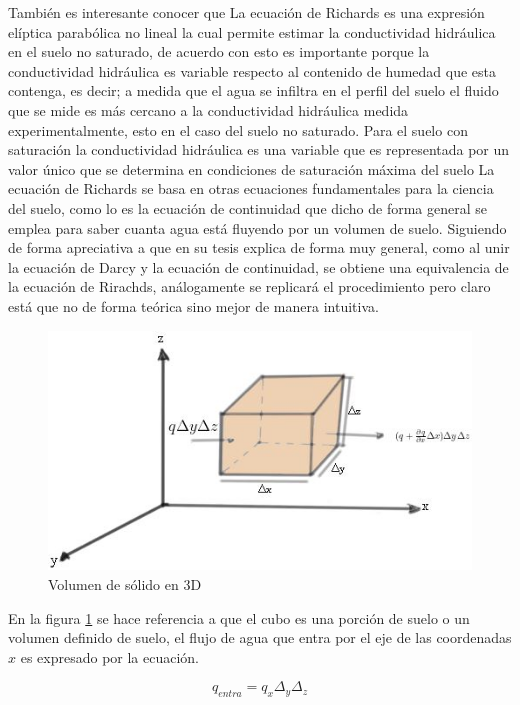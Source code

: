 También es interesante conocer que  La ecuación de Richards es una expresión elíptica parabólica no lineal la cual permite estimar la conductividad hidráulica en el suelo no saturado, de acuerdo con  \parencite{luna2005metodos} esto es importante  porque la conductividad hidráulica es variable respecto al contenido de humedad que esta contenga, es decir; a medida que el agua se infiltra en el perfil del suelo el fluido que se mide es más cercano a la conductividad hidráulica medida experimentalmente, esto en el caso del suelo no saturado. Para el suelo con saturación la conductividad hidráulica es una variable que es representada por un valor único que se determina en condiciones de saturación máxima del suelo
La ecuación de Richards se basa en otras ecuaciones fundamentales para la ciencia del suelo, como lo es la ecuación de continuidad que dicho de forma general se emplea para saber cuanta agua está fluyendo por un volumen de suelo. Siguiendo de forma apreciativa a \parencite{martinez2013aproximacion} que en su tesis explica de forma muy general, como al unir la ecuación de Darcy y la ecuación de continuidad, se obtiene una equivalencia de la ecuación de Rirachds, análogamente se replicará el procedimiento pero claro está que no de forma teórica sino mejor de manera intuitiva.\\ 
\begin{figure}[h]
	\centering
	\includegraphics[scale=0.7]{Imagenes/Solido en 3D.JPG}
	\caption{Volumen de sólido en 3D}
	\label{richardseq1}
\end{figure}

En la figura \ref{richardseq1} se hace referencia a que el cubo es una porción de suelo o un volumen definido de suelo, el flujo de agua que entra por el eje de las coordenadas $x$ es expresado por la ecuación.

\begin{equation}
	q_{entra}= q_{x} \varDelta_{y}\varDelta_{z}
	\label{Richardseq2}
\end{equation}

